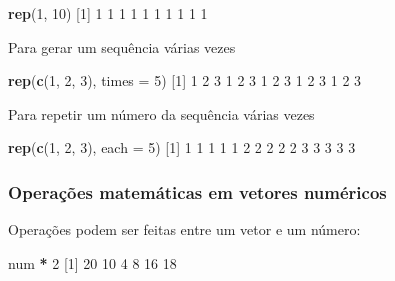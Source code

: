 \documentclass[10pt,a4paper]{book}
\newenvironment{Shaded}{\begin{snugshade}}{\end{snugshade}}
\newcommand{\KeywordTok}[1]{\textcolor[rgb]{0.13,0.29,0.53}{\textbf{#1}}}
\newcommand{\DataTypeTok}[1]{\textcolor[rgb]{0.13,0.29,0.53}{#1}}
\newcommand{\DecValTok}[1]{\textcolor[rgb]{0.00,0.00,0.81}{#1}}
\newcommand{\StringTok}[1]{\textcolor[rgb]{0.31,0.60,0.02}{#1}}
\newcommand{\OperatorTok}[1]{\textcolor[rgb]{0.81,0.36,0.00}{\textbf{#1}}}
\newcommand{\NormalTok}[1]{#1}
\begin{document}
\begin{Shaded}
\begin{Highlighting}[]
\KeywordTok{rep}\NormalTok{(}\DecValTok{1}\NormalTok{, }\DecValTok{10}\NormalTok{)}
\NormalTok{ [}\DecValTok{1}\NormalTok{] }\DecValTok{1} \DecValTok{1} \DecValTok{1} \DecValTok{1} \DecValTok{1} \DecValTok{1} \DecValTok{1} \DecValTok{1} \DecValTok{1} \DecValTok{1}
\end{Highlighting}
\end{Shaded}

Para gerar um sequência várias vezes

\begin{Shaded}
\begin{Highlighting}[]
\KeywordTok{rep}\NormalTok{(}\KeywordTok{c}\NormalTok{(}\DecValTok{1}\NormalTok{, }\DecValTok{2}\NormalTok{, }\DecValTok{3}\NormalTok{), }\DataTypeTok{times =} \DecValTok{5}\NormalTok{)}
\NormalTok{ [}\DecValTok{1}\NormalTok{] }\DecValTok{1} \DecValTok{2} \DecValTok{3} \DecValTok{1} \DecValTok{2} \DecValTok{3} \DecValTok{1} \DecValTok{2} \DecValTok{3} \DecValTok{1} \DecValTok{2} \DecValTok{3} \DecValTok{1} \DecValTok{2} \DecValTok{3}
\end{Highlighting}
\end{Shaded}

Para repetir um número da sequência várias vezes

\begin{Shaded}
\begin{Highlighting}[]
\KeywordTok{rep}\NormalTok{(}\KeywordTok{c}\NormalTok{(}\DecValTok{1}\NormalTok{, }\DecValTok{2}\NormalTok{, }\DecValTok{3}\NormalTok{), }\DataTypeTok{each =} \DecValTok{5}\NormalTok{)}
\NormalTok{ [}\DecValTok{1}\NormalTok{] }\DecValTok{1} \DecValTok{1} \DecValTok{1} \DecValTok{1} \DecValTok{1} \DecValTok{2} \DecValTok{2} \DecValTok{2} \DecValTok{2} \DecValTok{2} \DecValTok{3} \DecValTok{3} \DecValTok{3} \DecValTok{3} \DecValTok{3}
\end{Highlighting}
\end{Shaded}

\subsubsection{Operações matemáticas em vetores
numéricos}\label{operauxe7uxf5es-matemuxe1ticas-em-vetores-numuxe9ricos}

Operações podem ser feitas entre um vetor e um número:

\begin{Shaded}
\begin{Highlighting}[]
\NormalTok{num }\OperatorTok{*}\StringTok{ }\DecValTok{2}
\NormalTok{[}\DecValTok{1}\NormalTok{] }\DecValTok{20} \DecValTok{10}  \DecValTok{4}  \DecValTok{8} \DecValTok{16} \DecValTok{18}
\end{Highlighting}
\end{Shaded}
\end{document}
